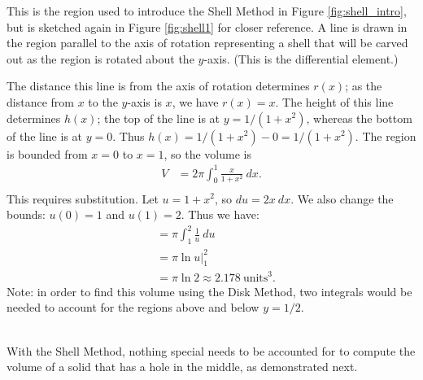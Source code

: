 {This is the region used to introduce the Shell Method in Figure \ref{fig:shell_intro}, but is sketched again in Figure \ref{fig:shell1} for closer reference. A line is drawn in the region parallel to the axis of rotation representing a shell that will be carved out as the region is rotated about the $y$-axis. (This is the differential element.)

The distance this line is from the axis of rotation determines $r(x)$; as the distance from $x$ to the $y$-axis is $x$, we have $r(x)=x$. The height of this line determines $h(x)$; the top of the line is at $y=1/(1+x^2)$, whereas the bottom of the line is at $y=0$. Thus $h(x) = 1/(1+x^2)-0 = 1/(1+x^2)$. The region is bounded from $x=0$ to $x=1$, so the volume is 
\begin{align*}
V 	&= 2\pi\int_0^1 \frac{x}{1+x^2}\ dx. \\
\end{align*}
This requires substitution. Let $u=1+x^2$, so $du = 2x\ dx$. We also change the bounds: $u(0) = 1$ and $u(1) = 2$. Thus we have:
\begin{align*}
		&= \pi\int_1^2 \frac{1}{u}\ du \\
		&= \pi\ln u\Big|_1^2\\
		&= \pi\ln 2 \approx 2.178 \ \text{units}^3.
\end{align*}
Note: in order to find this volume using the Disk Method, two integrals would be needed to account for the regions above and below $y=1/2$.
}\\

With the Shell Method, nothing special needs to be accounted for to compute the volume of a solid that has a hole in the middle, as demonstrated next.\\

